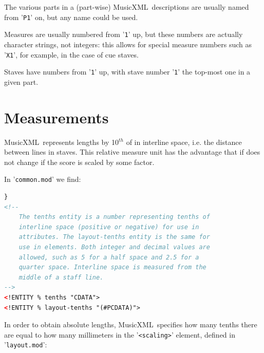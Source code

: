 \documentclass[12pt,a4paper]{article}
\newcommand{\mxml}{MusicXML}
\begin{document}
The various parts in a (part-wise) \mxml\ descriptions are usually named from '{\tt P1}' on, but any name could be used.

Measures are usually numbered from {'\tt 1}' up, but these numbers are actually character strings, not integers: this allows for special measure numbers such as {'\tt X1}', for example, in the case of cue staves.

Staves have numbers from {'\tt 1}' up, with stave number {'\tt 1}' the top-most one in a given part.

\section{Measurements}

\mxml\ represents lengths by 10$^{th}$ of in interline space, i.e. the distance between lines in staves. This relative measure unit has the advantage that if does not change if the score is scaled by some factor.

In {'\tt common.mod}' we find:

\begin{lstlisting}[language=XML]
}
<!--
	The tenths entity is a number representing tenths of
	interline space (positive or negative) for use in
	attributes. The layout-tenths entity is the same for
	use in elements. Both integer and decimal values are 
	allowed, such as 5 for a half space and 2.5 for a 
	quarter space. Interline space is measured from the
	middle of a staff line.
-->
<!ENTITY % tenths "CDATA">
<!ENTITY % layout-tenths "(#PCDATA)">
\end{lstlisting}

In order to obtain absolute lengths, \mxml\ specifies how many tenths there are equal to how many millimeters in the {'\tt <scaling>}' element, defined in {'\tt layout.mod}':
\end{document}
